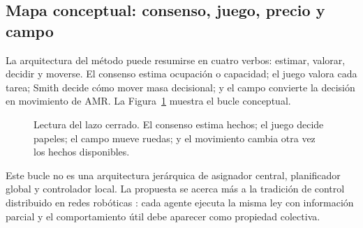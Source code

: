 \subsection{Mapa conceptual: consenso, juego, precio y campo}

La arquitectura del método puede resumirse en cuatro verbos: estimar, valorar, decidir
y moverse. El consenso estima ocupación o capacidad; el juego valora cada tarea; Smith
decide cómo mover masa decisional; y el campo convierte la decisión en movimiento de
AMR. La Figura~\ref{fig:marco_capas} muestra el bucle conceptual.

\begin{figure}[H]
\centering
{}
\caption{Lectura del lazo cerrado. El consenso estima hechos; el juego decide papeles;
el campo mueve ruedas; y el movimiento cambia otra vez los hechos disponibles.}
\label{fig:marco_capas}
\end{figure}

Este bucle no es una arquitectura jerárquica de asignador central, planificador global y
controlador local. La propuesta se acerca más a la tradición de control distribuido en
redes robóticas \citep{bullo2009distributed,ren2008distributed}: cada agente ejecuta la
misma ley con información parcial y el comportamiento útil debe aparecer como propiedad
colectiva.

